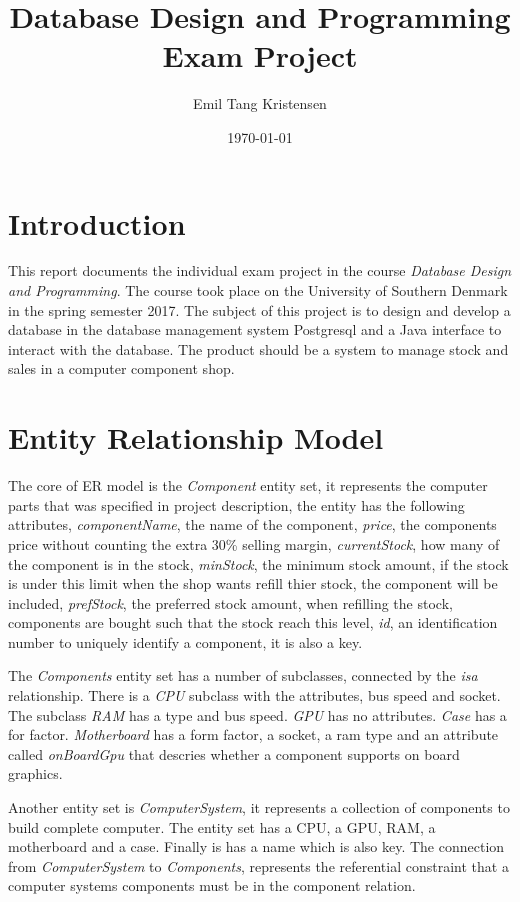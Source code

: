 \documentclass[12pt,a4paper]{article}
\title{\textbf{Database Design and Programming \\Exam Project}}
\author{Emil Tang Kristensen}
\date{\today}
\begin{document}
\maketitle
\tableofcontents

\newpage

\section{Introduction}
This report documents the individual exam project in the course \emph{Database Design and Programming}. 
The course took place on the University of Southern Denmark in the spring semester 2017.
The subject of this project is to design and develop a database in the database management system Postgresql and a Java interface to interact with the database.  
The product should be a system to manage stock and sales in a computer component shop.

\section{Entity Relationship Model}
The core of ER model is the \emph{Component} entity set, it represents the computer parts that was specified in project description, the entity has the following attributes,
\emph{componentName}, the name of the component,
\emph{price}, the components price without counting the extra 30\% selling margin,
\emph{currentStock}, how many of the component is in the stock,
\emph{minStock}, the minimum stock amount, if the stock is under this limit when the shop wants refill thier stock, the component will be included,
\emph{prefStock}, the preferred stock amount, when refilling the stock, components are bought such that the stock reach this level,
\emph{id}, an identification number to uniquely identify a component, it is also a key.

The \emph{Components} entity set has a number of subclasses, connected by the \emph{isa} relationship. 
There is a \emph{CPU} subclass with the attributes, bus speed and socket.
The subclass \emph{RAM} has a type and bus speed.
\emph{GPU} has no attributes.
\emph{Case} has a for factor.
\emph{Motherboard} has a form factor, a socket, a ram type and an attribute called \emph{onBoardGpu} that descries whether a component supports on board graphics.

Another entity set is \emph{ComputerSystem}, it represents a collection of components to build complete computer. The entity set has a CPU, a GPU, RAM, a motherboard and a case. Finally is has a name which is also key. The connection from \emph{ComputerSystem} to \emph{Components}, represents the referential constraint that a computer systems components must be in the component relation.
\end{document}
